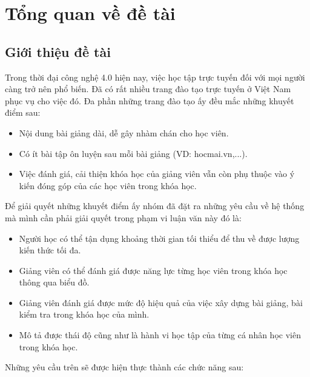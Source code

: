 \setcounter{chapter}{0}
\fontsize{13}{5}\selectfont
\chapter{Tổng quan về đề tài}
\section{Giới thiệu đề tài}
Trong thời đại công nghệ 4.0 hiện nay, việc học tập trực tuyến đối với mọi người càng trở nên phổ biến. Đã có rất nhiều trang đào tạo trực tuyến ở Việt Nam phục vụ cho việc đó. Đa phần những trang đào tạo ấy đều mắc những khuyết điểm sau:

\begin{itemize}
	\item Nội dung bài giảng dài, dễ gây nhàm chán cho học viên.
	\item Có ít bài tập ôn luyện sau mỗi bài giảng (VD: hocmai.vn,...).
	\item Việc đánh giá, cải thiện khóa học của giảng viên vẫn còn phụ thuộc vào ý kiến đóng góp của các học viên trong khóa học.
\end{itemize}

Để giải quyết những khuyết điểm ấy nhóm đã đặt ra những yêu cầu về hệ thống mà mình cần phải giải quyết trong phạm vi luận văn này đó là:

\begin{itemize}
	\item Người học có thể tận dụng khoảng thời gian tối thiểu để thu về được lượng kiến thức tối đa.
	\item Giảng viên có thể đánh giá được năng lực từng học viên trong khóa học thông qua biểu đồ.
	\item Giảng viên đánh giá được mức độ hiệu quả của việc xây dựng bài giảng, bài kiểm tra trong khóa học của mình.
	\item Mô tả được thái độ cũng như là hành vi học tập của từng cá nhân học viên trong khóa học.
\end{itemize}

Những yêu cầu trên sẽ được hiện thực thành các chức năng sau:

